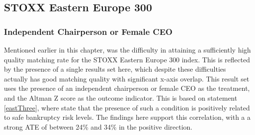 \subsection{STOXX Eastern Europe 300}
\subsubsection{Independent Chairperson or Female CEO}
{Mentioned earlier in this chapter, was the difficulty in attaining a sufficiently high quality matching rate for the STOXX Eastern Europe 300 index. This is reflected by the presence of a single results set here, which despite these difficulties actually has good matching quality with significant x-axis overlap. This result set uses the presence of an independent chairperson or female CEO as the treatment, and the Altman Z score as the outcome indicator. This is based on statement \ref{eastThree}, where \cite{moldovan2015learning} state that the presence of such a condition is positively related to safe bankruptcy risk levels. The findings here support this correlation, with a a strong ATE of between 24\% and 34\% in the positive direction. }
